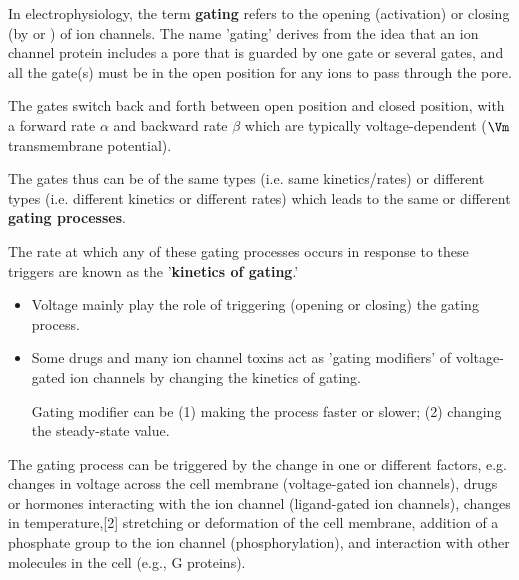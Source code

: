 In electrophysiology, the term {\bf gating} refers to the opening (activation)
or closing (by \deactivation or \inactivation) of ion channels.
The name 'gating' derives from the idea that an ion channel protein includes a
pore that is guarded by one gate or several gates, and all the gate(s) must be
in the open position for any ions to pass through the pore.

The gates switch back and forth between open position and closed position, with
a forward rate $\alpha$ and backward rate $\beta$ which are typically
voltage-dependent ($\Vm$ transmembrane potential).

The gates thus can be of the same types (i.e. same kinetics/rates) or different
types (i.e. different kinetics or different rates) which leads to the same or
different {\bf gating processes}.

The rate at which any of these gating processes occurs in response to these
triggers are known as the '{\bf kinetics of gating}.'
\begin{itemize}
  \item Voltage mainly play the role of triggering (opening or closing) the
  gating process.
  
  \item Some drugs and many ion channel toxins act as 'gating modifiers' of
  voltage-gated ion channels by changing the kinetics of gating.
  
  Gating modifier can be (1)  making the process faster or slower; (2)
  changing the steady-state value.
   
\end{itemize}

The gating process can be triggered by the change in one or different factors,
e.g. changes in voltage across the cell membrane (voltage-gated ion channels),
drugs or hormones interacting with the ion channel (ligand-gated ion channels),
changes in temperature,[2] stretching or deformation of the cell membrane,
addition of a phosphate group to the ion channel (phosphorylation), and
interaction with other molecules in the cell (e.g., G proteins).

